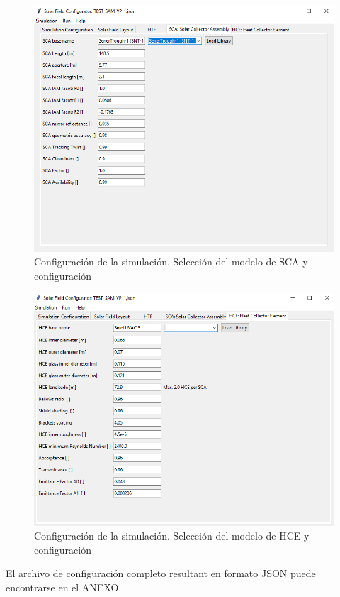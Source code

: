 \documentclass[12pt]{report} %
\begin{document}
\begin{figure}
\includegraphics[scale=0.8]{images/interface04.png}
\caption{Configuración de la simulación. Selección del modelo de SCA y configuración} 
\label{fig:interface04}
\end{figure}

\begin{figure}
\includegraphics[scale=0.8]{images/interface05.png}
\caption{Configuración de la simulación. Selección del modelo de HCE y configuración} 
\label{fig:interface05}
\end{figure}

El archivo de configuración completo resultant en formato JSON puede encontrarse en el ANEXO.
\end{document}
